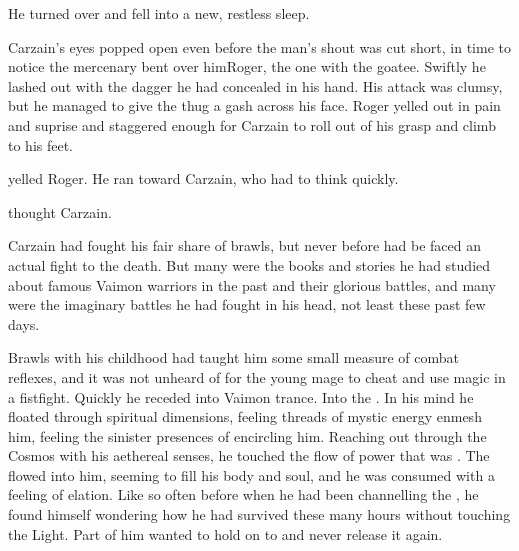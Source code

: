 He turned over and fell into a new, restless sleep. 



\begin{comment}
\subsection{Attack}
\end{comment}
\new
\begin{comment}
\subsubsection{Carzain fights}
\end{comment}

Carzain's eyes popped open even before the man's shout was cut short, in time to notice the mercenary bent over him\dash{}Roger, the one with the goatee. Swiftly he lashed out with the dagger he had concealed in his hand. His attack was clumsy, but he managed to give the thug a gash across his face. Roger yelled out in pain and suprise and staggered enough for Carzain to roll out of his grasp and climb to his feet. 


 yelled Roger. 
He ran toward Carzain, who had to think quickly. 

 thought Carzain. 

Carzain had fought his fair share of brawls, but never before had be faced an actual fight to the death. 
But many were the books and stories he had studied about famous Vaimon warriors in the past and their glorious battles, and many were the imaginary battles he had fought in his head, not least these past few days. 


Brawls with his childhood had taught him some small measure of combat reflexes, and it was not unheard of for the young mage to cheat and use magic in a fistfight. 
Quickly he receded into Vaimon trance. 
Into the . 
In his mind he floated through spiritual dimensions, feeling threads of mystic energy enmesh him, feeling the sinister presences of \qliphoth{} encircling him. 
Reaching out through the Cosmos with his aethereal senses, he touched the flow of power that was . 
The  flowed into him, seeming to fill his body and soul, and he was consumed with a feeling of elation. 
Like so often before when he had been channelling the , he found himself wondering how he had survived these many hours without touching the Light. 
Part of him wanted to hold on to \iquin{} and never release it again. 

